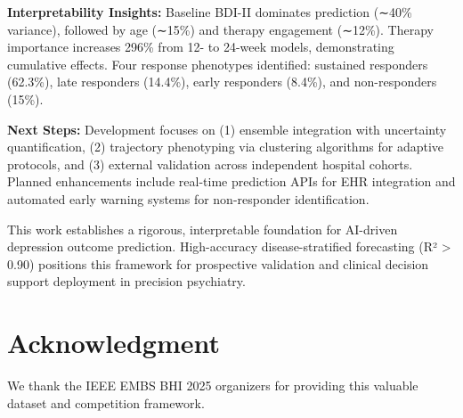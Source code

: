 \documentclass[conference]{IEEEtran}
\begin{document}
\textbf{Interpretability Insights:} Baseline BDI-II dominates prediction (∼40\% variance), followed by age (∼15\%) and therapy engagement (∼12\%). Therapy importance increases 296\% from 12- to 24-week models, demonstrating cumulative effects. Four response phenotypes identified: sustained responders (62.3\%), late responders (14.4\%), early responders (8.4\%), and non-responders (15\%).

\textbf{Next Steps:} Development focuses on (1) ensemble integration with uncertainty quantification, (2) trajectory phenotyping via clustering algorithms for adaptive protocols, and (3) external validation across independent hospital cohorts. Planned enhancements include real-time prediction APIs for EHR integration and automated early warning systems for non-responder identification.

This work establishes a rigorous, interpretable foundation for AI-driven depression outcome prediction. High-accuracy disease-stratified forecasting (R² > 0.90) positions this framework for prospective validation and clinical decision support deployment in precision psychiatry.

\section*{Acknowledgment}
We thank the IEEE EMBS BHI 2025 organizers for providing this valuable dataset and competition framework.
\end{document}
